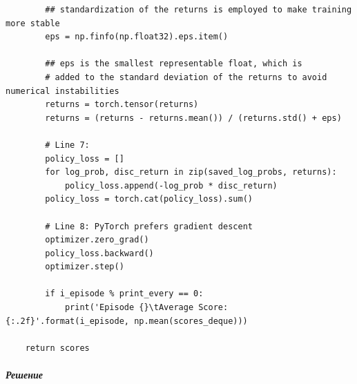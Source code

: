 \documentclass[11pt,a4paper]{article}
\begin{document}
\begin{lstlisting}
        ## standardization of the returns is employed to make training more stable
        eps = np.finfo(np.float32).eps.item()

        ## eps is the smallest representable float, which is
        # added to the standard deviation of the returns to avoid numerical instabilities
        returns = torch.tensor(returns)
        returns = (returns - returns.mean()) / (returns.std() + eps)

        # Line 7:
        policy_loss = []
        for log_prob, disc_return in zip(saved_log_probs, returns):
            policy_loss.append(-log_prob * disc_return)
        policy_loss = torch.cat(policy_loss).sum()

        # Line 8: PyTorch prefers gradient descent
        optimizer.zero_grad()
        policy_loss.backward()
        optimizer.step()

        if i_episode % print_every == 0:
            print('Episode {}\tAverage Score: {:.2f}'.format(i_episode, np.mean(scores_deque)))

    return scores
\end{lstlisting}

\subparagraph{Решение}\label{solution-1}
\end{document}
